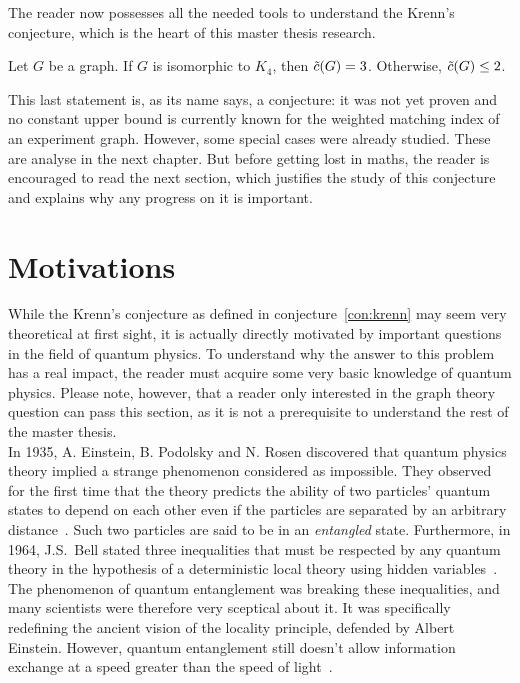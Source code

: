 The reader now possesses all the needed tools to understand the Krenn's conjecture, which is the heart of this master thesis research.

\begin{conjecture}
    \label{con:krenn}
    Let $G$ be a graph.
    If $G$ is isomorphic to $K_4$, then $\Tilde{c}(G) = 3$.
    Otherwise, $\Tilde{c}(G) \leq 2$.
\end{conjecture}

This last statement is, as its name says, a conjecture: it was not yet proven and no constant upper bound is currently known for the weighted matching index of an experiment graph.
However, some special cases were already studied.
These are analyse in the next chapter.
But before getting lost in maths, the reader is encouraged to read the next section, which justifies the study of this conjecture and explains why any progress on it is important.


\section{Motivations}
\label{sec:motivations}

While the Krenn's conjecture as defined in conjecture~\ref{con:krenn} may seem very theoretical at first sight, it is actually directly motivated by important questions in the field of quantum physics.
To understand why the answer to this problem has a real impact, the reader must acquire some very basic knowledge of quantum physics.
Please note, however, that a reader only interested in the graph theory question can pass this section, as it is not a prerequisite to understand the rest of the master thesis. \\

In 1935, A. Einstein, B. Podolsky and N. Rosen discovered that quantum physics theory implied a strange phenomenon considered as impossible.
They observed for the first time that the theory predicts the ability of two particles' quantum states to depend on each other even if the particles are separated by an arbitrary distance~\cite{EPR}.
Such two particles are said to be in an \textit{entangled} state.
Furthermore, in 1964, J.S.\ Bell stated three inequalities that must be respected by any quantum theory in the hypothesis of a deterministic local theory using hidden variables~\cite{bell1964}.
The phenomenon of quantum entanglement was breaking these inequalities, and many scientists were therefore very sceptical about it.
It was specifically redefining the ancient vision of the locality principle, defended by Albert Einstein.
However, quantum entanglement still doesn't allow information exchange at a speed greater than the speed of light~\cite{notFasterThanLight}.\\

